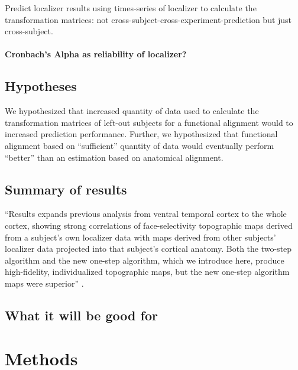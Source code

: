 
Predict localizer results using times-series of localizer to calculate the
transformation matrices:
%
not cross-subject-cross-experiment-prediction but just cross-subject.


\paragraph{Cronbach's Alpha as reliability of localizer?}



\subsection{Hypotheses}
%
We hypothesized that increased quantity of data used to calculate the
transformation matrices of left-out subjects for a functional alignment would to
increased prediction performance.
%
Further, we hypothesized that functional alignment based on ``sufficient''
quantity of data would eventually perform ``better'' than an estimation based on
anatomical alignment.


\subsection{Summary of results}


%
``Results expands previous analysis from ventral temporal cortex to the whole
cortex, showing strong correlations of face-selectivity topographic maps derived
from a subject's own localizer data with maps derived from other subjects'
localizer data projected into that subject's cortical anatomy. Both the two-step
algorithm and the new one-step algorithm, which we introduce here, produce
high-fidelity, individualized topographic maps, but the new one-step algorithm
maps were superior'' \citep{jiahui2020predicting}.


\subsection{What it will be good for}





\section{Methods}

